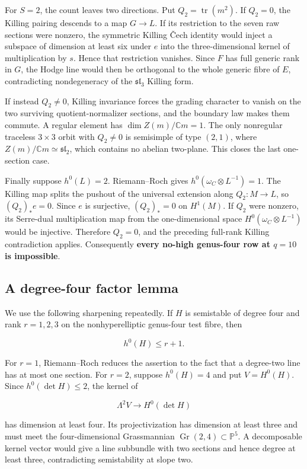 \documentclass[11pt]{article}
\theoremstyle{definition}
\begin{document}
For \(S=2\), the count leaves two directions. Put
\(Q_2=\operatorname{tr}(m^2)\). If \(Q_2=0\), the Killing pairing
descends to a map \(G\to L\). If its restriction to the seven raw
sections were nonzero, the symmetric Killing \v{C}ech identity would inject
a subspace of dimension at least six under \(e\) into the
three-dimensional kernel of multiplication by \(s\). Hence that
restriction vanishes. Since \(F\) has full generic rank in \(G\), the
Hodge line would then be orthogonal to the whole generic fibre of \(E\),
contradicting nondegeneracy of the \(\mathfrak{sl}_3\) Killing form.

If instead \(Q_2\ne0\), Killing invariance forces the grading character
to vanish on the two surviving quotient-normalizer sections, and the
boundary law makes them commute. A regular element has
\(\dim Z(m)/\mathbb C m=1\). The only nonregular traceless \(3\times3\)
orbit with \(Q_2\ne0\) is semisimple of type \((2,1)\), where
\(Z(m)/\mathbb C m\simeq\mathfrak{sl}_2\), which contains no abelian
two-plane. This closes the last one-section case.

Finally suppose \(h^0(L)=2\). Riemann--Roch gives
\(h^0(\omega_C\otimes L^{-1})=1\). The Killing map splits the pushout of
the universal extension along \(Q_2:M\to L\), so \((Q_2)_*e=0\). Since
\(e\) is surjective, \((Q_2)_*=0\) on \(H^1(M)\). If \(Q_2\) were
nonzero, its Serre-dual multiplication map from the one-dimensional
space \(H^0(\omega_C\otimes L^{-1})\) would be injective. Therefore
\(Q_2=0\), and the preceding full-rank Killing contradiction applies.
Consequently \textbf{every no-high genus-four row at \(q=10\) is
impossible}.

\subsection{A degree-four factor
lemma}\label{a-degree-four-factor-lemma}

We use the following sharpening repeatedly. If \(H\) is semistable of
degree four and rank \(r=1,2,3\) on the nonhyperelliptic genus-four test
fibre, then

\[h^0(H)\le r+1.\]

For \(r=1\), Riemann--Roch reduces the assertion to the fact that a
degree-two line has at most one section. For \(r=2\), suppose
\(h^0(H)=4\) and put \(V=H^0(H)\). Since \(h^0(\det H)\le2\), the kernel
of

\[\Lambda^2V\longrightarrow H^0(\det H)\]

has dimension at least four. Its projectivization has dimension at least
three and must meet the four-dimensional Grassmannian
\(\operatorname{Gr}(2,4)\subset\mathbb P^5\). A decomposable kernel
vector would give a line subbundle with two sections and hence degree at
least three, contradicting semistability at slope two.
\end{document}
